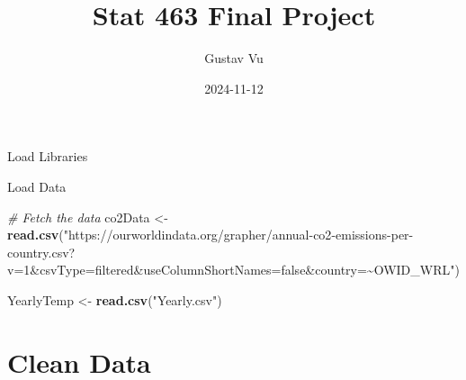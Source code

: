 \documentclass[
]{article}
\title{Stat 463 Final Project}
\author{Gustav Vu}
\date{2024-11-12}
\newenvironment{Shaded}{\begin{snugshade}}{\end{snugshade}}
\newcommand{\CommentTok}[1]{\textcolor[rgb]{0.56,0.35,0.01}{\textit{#1}}}
\newcommand{\FunctionTok}[1]{\textcolor[rgb]{0.13,0.29,0.53}{\textbf{#1}}}
\newcommand{\NormalTok}[1]{#1}
\newcommand{\OtherTok}[1]{\textcolor[rgb]{0.56,0.35,0.01}{#1}}
\newcommand{\StringTok}[1]{\textcolor[rgb]{0.31,0.60,0.02}{#1}}
\begin{document}
\maketitle

Load Libraries

Load Data

\begin{Shaded}
\begin{Highlighting}[]
\CommentTok{\# Fetch the data}
\NormalTok{co2Data }\OtherTok{\textless{}{-}} \FunctionTok{read.csv}\NormalTok{(}\StringTok{"https://ourworldindata.org/grapher/annual{-}co2{-}emissions{-}per{-}country.csv?v=1\&csvType=filtered\&useColumnShortNames=false\&country=\textasciitilde{}OWID\_WRL"}\NormalTok{)}


\NormalTok{YearlyTemp }\OtherTok{\textless{}{-}} \FunctionTok{read.csv}\NormalTok{(}\StringTok{"Yearly.csv"}\NormalTok{)}
\end{Highlighting}
\end{Shaded}

\hypertarget{clean-data}{%
\section{Clean Data}\label{clean-data}}
\end{document}
